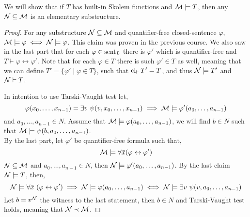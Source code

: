 \subquestion{}
We will show that if $T$ has built-in Skolem functions and $\mathcal{M} \models T$, then any $\mathcal{N} \subseteq \mathcal{M}$ is an elementary substructure.
\begin{proof}
	For any substructure $\mathcal{N} \subseteq \mathcal{M}$ and quantifier-free closed-sentence $\varphi$, $\mathcal{M} \models \varphi \iff \mathcal{N} \models \varphi$.
	This claim was proven in the previous course.
	We also saw in the last part that for each $\varphi \in \operatorname{sent}_L$ there is $\varphi'$ which is quantifier-free and $T \vdash \varphi \leftrightarrow \varphi'$.
	Note that for each $\varphi \in T$ there is such $\varphi' \in T$ as well, meaning that we can define $T' = \{ \varphi' \mid \varphi \in T \}$,
	such that $\operatorname{cl}_{\vdash} T' = T$, and thus $\mathcal{N} \models T'$ and $\mathcal{N} \vdash T$.

	In intention to use Tarski-Vaught test let,
	\[
		\varphi(x_0, \ldots, x_{n - 1}) = \exists v\ \psi(v, x_0, \ldots, x_{n - 1})
		\implies \Mm \models \varphi'(a_0, \ldots, a_{n - 1})
	\]
	and $a_0, \ldots, a_{n - 1} \in N$.
	Assume that $\mathcal{M} \models \varphi(a_0, \ldots, a_{n - 1})$, we will find $b \in N$ such that $\mathcal{M} \models \psi(b, a_0, \ldots, a_{n - 1})$. \\
	By the last part, let $\varphi'$ be quantifier-free formula such that,
	\[
		\mathcal{M} \models \forall \bar{x} (\varphi \leftrightarrow \varphi')
	\]
	$\mathcal{N} \subseteq \mathcal{M}$ and $a_0, \ldots, a_{n - 1} \in N$, then $\mathcal{N} \models \varphi'(a_0, \ldots, a_{n - 1})$.
	By the last claim $\mathcal{N} \models T$, then,
	\[
		\mathcal{N} \models \forall \bar{x}\ (\varphi \leftrightarrow \varphi')
		\implies \mathcal{N} \models \varphi(a_0, \ldots, a_{n - 1})
		\iff \mathcal{N} \models \exists v\ \psi(v, a_0, \ldots, a_{n - 1})
	\]
	Let $b = v^{\mathcal{N}}$ the witness to the last statement, then $b \in N$ and Tarski-Vaught test holds, meaning that $\mathcal{N} \prec \mathcal{M}$.
\end{proof}

